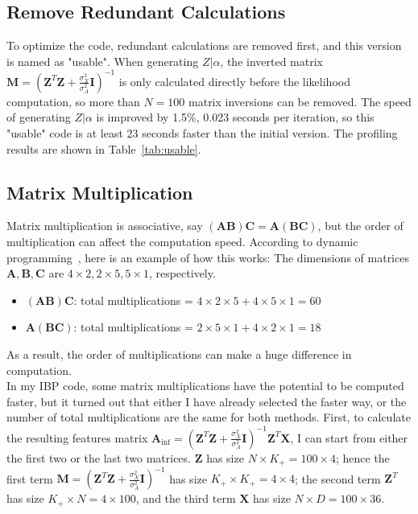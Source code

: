 \subsection{Remove Redundant Calculations}
\label{sub:usable}
To optimize the code, redundant calculations are removed first, and this version is named as "usable". When generating $Z|\alpha$, the inverted matrix $\mathbf{M} = (\mathbf{Z}^T\mathbf{Z}+\frac{\sigma_X^2}{\sigma_A^2}\mathbf{I})^{-1}$ is only calculated directly before the likelihood computation, so more than $N = 100$ matrix inversions can be removed. The speed of generating $Z|\alpha$ is improved by 1.5\%, 0.023 seconds per iteration, so this "usable" code is at least 23 seconds faster than the initial version. The profiling results are shown in Table~\ref{tab:usable}. 

\subsection{Matrix Multiplication}
Matrix multiplication is associative, say $(\mathbf{A}\mathbf{B})\mathbf{C} = \mathbf{A}(\mathbf{B}\mathbf{C})$, but the order of multiplication can affect the computation speed. According to dynamic programming~\cite{matrixmult}, here is an example of how this works: The dimensions of matrices $\mathbf{A},\mathbf{B},\mathbf{C}$ are $4 \times 2,2 \times 5, 5 \times 1$, respectively.
\begin{itemize}
\item $(\mathbf{A}\mathbf{B})\mathbf{C}$: total multiplications = $4 \times 2 \times 5 + 4 \times 5 \times 1 = 60$
\item $\mathbf{A}(\mathbf{B}\mathbf{C})$: total multiplications = $2 \times 5 \times 1 + 4 \times 2 \times 1 = 18$
\end{itemize}
As a result, the order of multiplications can make a huge difference in computation.\\

In my IBP code, some matrix multiplications have the potential to be computed faster, but it turned out that either I have already selected the faster way, or the number of total multiplications are the same for both methods. First, to calculate the resulting features matrix $\mathbf{A}_{\text{inf}} = (\mathbf{Z}^T\mathbf{Z}+\frac{\sigma_X^2}{\sigma_A^2}\mathbf{I})^{-1}\mathbf{Z}^T \mathbf{X}$, I can start from either the first two or the last two matrices. $\mathbf{Z}$ has size $N \times K_+ = 100 \times 4$; hence the first term $\mathbf{M} = (\mathbf{Z}^T\mathbf{Z}+\frac{\sigma_X^2}{\sigma_A^2}\mathbf{I})^{-1}$ has size $K_+ \times K_+ = 4 \times 4$; the second term $\mathbf{Z}^T$ has size $K_+ \times N = 4 \times 100$, and the third term $\mathbf{X}$ has size $N \times D = 100 \times 36$.

